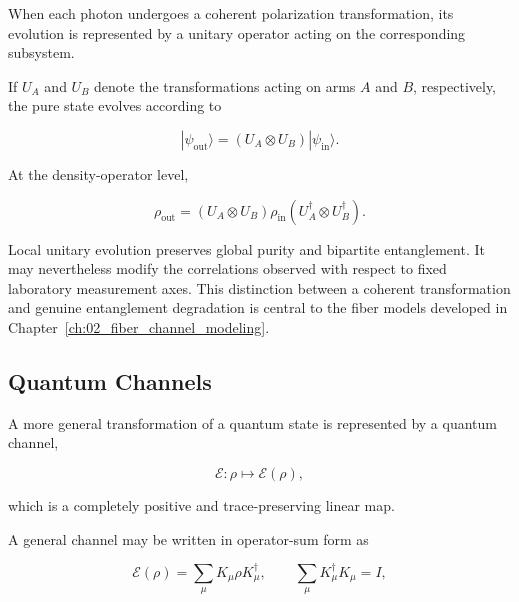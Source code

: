 When each photon undergoes a coherent polarization transformation, its evolution
is represented by a unitary operator acting on the corresponding subsystem.

If \(U_A\) and \(U_B\) denote the transformations acting on arms \(A\) and \(B\),
respectively, the pure state evolves according to

\begin{equation}
|\psi_{\mathrm{out}}\rangle
=
(U_A\otimes U_B)
|\psi_{\mathrm{in}}\rangle.
\label{eq:local_unitary_state_evolution}
\end{equation}

At the density-operator level,

\begin{equation}
\rho_{\mathrm{out}}
=
(U_A\otimes U_B)
\rho_{\mathrm{in}}
(U_A^\dagger\otimes U_B^\dagger).
\label{eq:local_unitary_density_evolution}
\end{equation}

Local unitary evolution preserves global purity and bipartite entanglement.
It may nevertheless modify the correlations observed with respect to fixed
laboratory measurement axes. This distinction between a coherent transformation
and genuine entanglement degradation is central to the fiber models developed in
Chapter~\ref{ch:02_fiber_channel_modeling}.



\subsection{Quantum Channels}
\label{subsec:quantum_channels}

A more general transformation of a quantum state is represented by a quantum
channel,

\begin{equation}
\mathcal{E}:\rho\mapsto\mathcal{E}(\rho),
\label{eq:quantum_channel_map}
\end{equation}

which is a completely positive and trace-preserving linear map.

A general channel may be written in operator-sum form as~\cite{nielsen_chuang_qcqi,kraus1971general}

\begin{equation}
\mathcal{E}(\rho)
=
\sum_\mu
K_\mu
\rho
K_\mu^\dagger,
\qquad
\sum_\mu
K_\mu^\dagger K_\mu
=
I,
\label{eq:kraus_operator_sum}
\end{equation}

